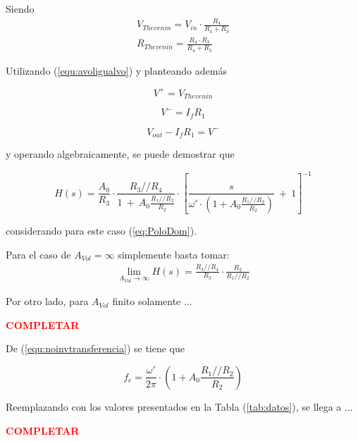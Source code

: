 Siendo 
\begin{align}
	V_{Thevenin} = V_{in} \cdot \frac{R_4}{R_4+R_3} \\
	R_{Thevenin} = \frac{R_4\cdot R_3}{R_4+R_3}
\label{eq:noinvthev}
\end{align} 

Utilizando (\ref{equ:avoligualvo}) y planteando además

\begin{equation}
	V^+ = V_{Thevenin}
	\label{equ:noinvv+}
\end{equation}

\begin{equation}
	V^- = I_f R_1
\end{equation}

\begin{equation}
	V_{out} - I_f R_1 = V^-
\end{equation}

y operando algebraicamente, se puede demostrar que

\begin{equation}
	H \left(s \right) =\frac{A_{0}}{R_3} \cdot	\frac{R_3 // R_4}{1 \ + \ A_{0} \frac{R_1 // R_2}{R_2} } \cdot \left[ \frac{s}{\omega' \cdot \left( 1 + A_{0} \frac{R_1 // R_2}{R_2} \right)}  \ + \ 1 \right]^{-1}
	\label{equ:noinvtransferencia}
\end{equation}

considerando para este caso (\ref{eq:PoloDom}).

Para el caso de $A_{Vol}=\infty$ simplemente basta tomar:
\begin{align}
	\lim_{A_{Vol}\to\infty} H \left(s \right) = \frac{R_3 // R_4}{R_3} \cdot \frac{R_2}{R_1 // R_2}
\end{align}

Por otro lado, para $A_{Vol}$ finito solamente ...

\begin{center}
\textcolor{red}{\textbf{COMPLETAR}}
\end{center}

De (\ref{equ:noinvtransferencia}) se tiene que

\begin{equation}
	f_c = \frac{\omega'}{2 \pi}\cdot \left( 1 + A_{0} \frac{R_1 // R_2}{R_2} \right)
\end{equation}

Reemplazando con los valores presentados en la Tabla (\ref{tab:datos}), se llega a ...

\begin{center}
\textcolor{red}{\textbf{COMPLETAR}}
\end{center}

